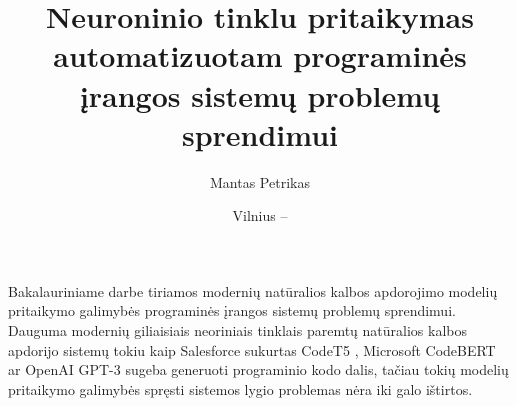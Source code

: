 \documentclass{VUMIFPSbakalaurinis}
\title{Neuroninio tinklu pritaikymas automatizuotam programinės įrangos sistemų problemų sprendimui}
\author{Mantas Petrikas}
\date{Vilnius – \the\year}
\begin{document}
\maketitle








\tableofcontents


Bakalauriniame darbe tiriamos modernių natūralios kalbos apdorojimo modelių pritaikymo galimybės programinės įrangos sistemų problemų sprendimui. 
Dauguma modernių giliaisiais neoriniais tinklais paremtų natūralios kalbos apdorijo sistemų tokiu kaip Salesforce sukurtas CodeT5 \cite{wang2021codet5}, Microsoft CodeBERT \cite{feng2020codebert} ar OpenAI GPT-3 \cite{brown2020language} sugeba generuoti programinio kodo dalis,
tačiau tokių modelių pritaikymo galimybės spręsti sistemos lygio problemas nėra iki galo ištirtos.
\end{document}
